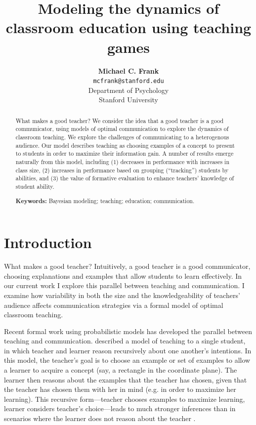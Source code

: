 \documentclass[10pt,letterpaper]{article}
\title{Modeling the dynamics of classroom education using teaching games}
\author{{\large \bf Michael C. Frank} \\
  \texttt{mcfrank@stanford.edu} \\
  Department of Psychology\\
  Stanford University}
\begin{document}
\maketitle

\begin{abstract}
What makes a good teacher? We consider the idea that a good teacher is a good communicator, using models of optimal communication to explore the dynamics of classroom teaching. We explore the challenges of communicating to a heterogenous audience. Our model describes teaching as choosing examples of a concept to present to students in order to maximize their information gain. A number of results emerge naturally from this model, including (1) decreases in performance with increases in class size, (2) increases in performance based on grouping (``tracking'') students by abilities, and (3) the value of formative evaluation to enhance teachers' knowledge of student ability. 

\textbf{Keywords:} 
Bayesian modeling; teaching; education; communication.
\end{abstract}

\section{Introduction}

What makes a good teacher? Intuitively, a good teacher is a good communicator, choosing explanations and examples that allow students to learn effectively. In our current work I explore this parallel between teaching and communication. I examine how variability in both the size and the knowledgeability of teachers' audience affects communication strategies via a formal model of optimal classroom teaching.  

Recent formal work using probabilistic models has developed the parallel between teaching and communication.  described a model of teaching to a single student, in which teacher and learner reason recursively about one another's intentions. In this model, the teacher's goal is to choose an example or set of examples to allow a learner to acquire a concept (say, a rectangle in the coordinate plane). The learner then reasons about the examples that the teacher has chosen, given that the teacher has chosen them with her in mind (e.g. in order to maximize her learning). This recursive form---teacher chooses examples to maximize learning, learner considers teacher's choice---leads to much stronger inferences than in scenarios where the learner does not reason about the teacher \cite{shafto2012}.
\end{document}
